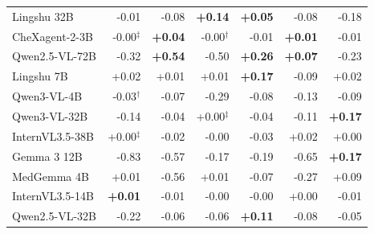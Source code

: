 \documentclass{article}
\begin{document}
\begin{table}[htbp]
{\begin{tabular}{lrrrrrr}
\midrule
Lingshu 32B & \cellcolor{cfSlate1}-0.01 & \cellcolor{cfSlate2}-0.08 & \cellcolor{cfTerra3}\textbf{+0.14} & \cellcolor{cfTerra2}\textbf{+0.05} & \cellcolor{cfSlate2}-0.08 & \cellcolor{cfSlate3}-0.18 \\
CheXagent-2-3B & \cellcolor{cfSlate1}-0.00$^{\ddagger}$ & \cellcolor{cfTerra2}\textbf{+0.04} & \cellcolor{cfSlate1}-0.00$^{\dagger}$ & \cellcolor{cfSlate1}-0.01 & \cellcolor{cfTerra1}\textbf{+0.01} & \cellcolor{cfSlate1}-0.01 \\
Qwen2.5-VL-72B & \cellcolor{cfSlate4}-0.32 & \cellcolor{cfTerra4}\textbf{+0.54} & \cellcolor{cfSlate4}-0.50 & \cellcolor{cfTerra4}\textbf{+0.26} & \cellcolor{cfTerra2}\textbf{+0.07} & \cellcolor{cfSlate3}-0.23 \\
Lingshu 7B & \cellcolor{cfTerra1}+0.02 & \cellcolor{cfTerra1}+0.01 & \cellcolor{cfTerra1}+0.01 & \cellcolor{cfTerra3}\textbf{+0.17} & \cellcolor{cfSlate2}-0.09 & \cellcolor{cfTerra1}+0.02 \\
Qwen3-VL-4B & \cellcolor{cfSlate2}-0.03$^{\dagger}$ & \cellcolor{cfSlate2}-0.07 & \cellcolor{cfSlate4}-0.29 & \cellcolor{cfSlate2}-0.08 & \cellcolor{cfSlate3}-0.13 & \cellcolor{cfSlate2}-0.09 \\
Qwen3-VL-32B & \cellcolor{cfSlate3}-0.14 & \cellcolor{cfSlate2}-0.04 & \cellcolor{cfTerra1}+0.00$^{\ddagger}$ & \cellcolor{cfSlate2}-0.04 & \cellcolor{cfSlate3}-0.11 & \cellcolor{cfTerra3}\textbf{+0.17} \\
InternVL3.5-38B & \cellcolor{cfTerra1}+0.00$^{\ddagger}$ & \cellcolor{cfSlate1}-0.02 & \cellcolor{cfSlate1}-0.00 & \cellcolor{cfSlate2}-0.03 & \cellcolor{cfTerra1}+0.02 & \cellcolor{cfTerra1}+0.00 \\
Gemma 3 12B & \cellcolor{cfSlate4}-0.83 & \cellcolor{cfSlate4}-0.57 & \cellcolor{cfSlate3}-0.17 & \cellcolor{cfSlate3}-0.19 & \cellcolor{cfSlate4}-0.65 & \cellcolor{cfTerra3}\textbf{+0.17} \\
MedGemma 4B & \cellcolor{cfTerra1}+0.01 & \cellcolor{cfSlate4}-0.56 & \cellcolor{cfTerra1}+0.01 & \cellcolor{cfSlate2}-0.07 & \cellcolor{cfSlate4}-0.27 & \cellcolor{cfTerra2}+0.09 \\
InternVL3.5-14B & \cellcolor{cfTerra1}\textbf{+0.01} & \cellcolor{cfSlate1}-0.01 & \cellcolor{cfSlate1}-0.00 & \cellcolor{cfSlate1}-0.00 & \cellcolor{cfTerra1}+0.00 & \cellcolor{cfSlate1}-0.01 \\
Qwen2.5-VL-32B & \cellcolor{cfSlate3}-0.22 & \cellcolor{cfSlate2}-0.06 & \cellcolor{cfSlate2}-0.06 & \cellcolor{cfTerra3}\textbf{+0.11} & \cellcolor{cfSlate2}-0.08 & \cellcolor{cfSlate2}-0.05 \\

\end{tabular}}
\end{table}
\end{document}
